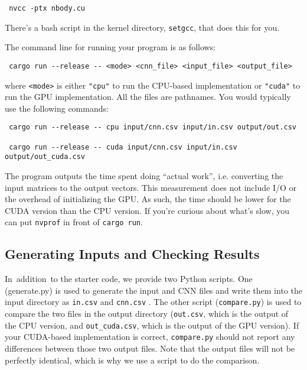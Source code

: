 \begin{verbatim}
 nvcc -ptx nbody.cu
\end{verbatim}


There's a bash script in the kernel directory, \texttt{setgcc}, that does this for you.

The command line for running your program is as follows:


\begin{verbatim}
 cargo run --release -- <mode> <cnn_file> <input_file> <output_file>
\end{verbatim}


where \texttt{<mode>} is either \texttt{"cpu"} to run the CPU-based implementation or \texttt{"cuda"} to run the GPU implementation. All the files are pathnames. You would typically use the following commands:


\begin{verbatim}
 cargo run --release -- cpu input/cnn.csv input/in.csv output/out.csv

 cargo run --release -- cuda input/cnn.csv input/in.csv output/out_cuda.csv
\end{verbatim}


The program outputs the time spent doing ``actual work'', i.e. converting the input matrices to the output vectors.  This measurement does not include I/O or the overhead of initializing the GPU. As such, the time should be lower for the CUDA version than the CPU version. If you're curious about what's slow, you can put \texttt{nvprof} in front of \texttt{cargo run}.




\subsection*{Generating Inputs and Checking Results}




In\ addition\ to the starter code, we provide two Python scripts. One (generate.py) is  used to generate the input and CNN files and write them into the input directory as \texttt{in.csv}  and \texttt{cnn.csv} .  The other script (\texttt{compare.py}) is used to compare the two files in the output directory (\texttt{out.csv}, which is the output of the CPU version, and \texttt{out\_cuda.csv}, which is the output of the GPU version). If your CUDA-based implementation is correct, \texttt{compare.py} should not report any differences between those two output files. Note that the output files will not be perfectly identical, which is why we use a script to do the comparison.



